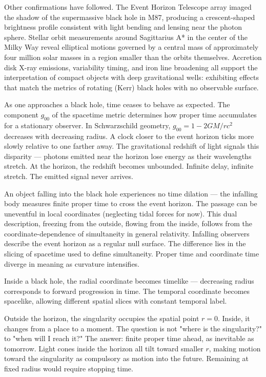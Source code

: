 Other confirmations have followed. The Event Horizon Telescope array imaged the shadow of the supermassive black hole in M87, producing a crescent-shaped brightness profile consistent with light bending and lensing near the photon sphere. Stellar orbit measurements around Sagittarius A* in the center of the Milky Way reveal elliptical motions governed by a central mass of approximately four million solar masses in a region smaller than the orbits themselves. Accretion disk X-ray emissions, variability timing, and iron line broadening all support the interpretation of compact objects with deep gravitational wells: exhibiting effects that match the metrics of rotating (Kerr) black holes with no observable surface.

As one approaches a black hole, time ceases to behave as expected. The component $g_{00}$ of the spacetime metric determines how proper time accumulates for a stationary observer. In Schwarzschild geometry, $g_{00} = 1 - 2GM/rc^2$ decreases with decreasing radius. A clock closer to the event horizon ticks more slowly relative to one farther away. The gravitational redshift of light signals this disparity — photons emitted near the horizon lose energy as their wavelengths stretch. At the horizon, the redshift becomes unbounded. Infinite delay, infinite stretch. The emitted signal never arrives.

An object falling into the black hole experiences no time dilation — the infalling body measures finite proper time to cross the event horizon. The passage can be uneventful in local coordinates (neglecting tidal forces for now). This dual description, freezing from the outside, flowing from the inside, follows from the coordinate-dependence of simultaneity in general relativity. Infalling observers describe the event horizon as a regular null surface. The difference lies in the slicing of spacetime used to define simultaneity. Proper time and coordinate time diverge in meaning as curvature intensifies.

Inside a black hole, the radial coordinate becomes timelike — decreasing radius corresponds to forward progression in time. The temporal coordinate becomes spacelike, allowing different spatial slices with constant temporal label.

Outside the horizon, the singularity occupies the spatial point $r = 0$. Inside, it changes from a place to a moment. The question is not "where is the singularity?" to "when will I reach it?" The answer: finite proper time ahead, as inevitable as tomorrow. Light cones inside the horizon all tilt toward smaller $r$, making motion toward the singularity as compulsory as motion into the future. Remaining at fixed radius would require stopping time.

